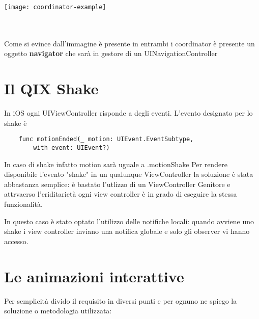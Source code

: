 \begin{minipage}{\linewidth}
    \centering
    \texttt{[image: coordinator-example]}
    \label{fig:5}
\end{minipage}\\ \\

Come si evince dall'immagine è presente in entrambi i coordinator è presente un oggetto
\textbf{navigator} che sarà in gestore di un UINavigationController

\section{Il QIX Shake}

In iOS ogni UIViewController risponde a degli eventi. L'evento designato per lo shake è
\begin{verbatim}
    func motionEnded(_ motion: UIEvent.EventSubtype,
        with event: UIEvent?)
\end{verbatim}

In caso di shake infatto motion sarà uguale a .motionShake
Per rendere disponibile l'evento "shake" in un qualunque ViewController la soluzione è stata abbastanza semplice:
è bastato l'utlizzo di un ViewController Genitore e attrvaerso l'eriditarietà ogni view controller è in grado
di eseguire la stessa funzionalità.

In questo caso è stato optato l'utilizzo delle notifiche locali: quando avviene uno shake i view controller inviano una notifica 
globale e solo gli observer vi hanno accesso.

\section{Le animazioni interattive}

Per semplicità divido il requisito in diversi punti e per ognuno ne spiego la soluzione
o metodologia utilizzata:

